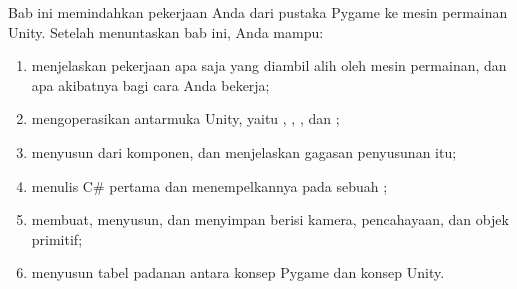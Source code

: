\begin{tujuanbox}
Bab ini memindahkan pekerjaan Anda dari pustaka Pygame ke mesin permainan
Unity. Setelah menuntaskan bab ini, Anda mampu:
\begin{enumerate}
  \item menjelaskan pekerjaan apa saja yang diambil alih oleh mesin permainan,
        dan apa akibatnya bagi cara Anda bekerja;
  \item mengoperasikan antarmuka Unity, yaitu ,
        , , dan ;
  \item menyusun  dari komponen, dan menjelaskan gagasan
        penyusunan itu;
  \item menulis  C\# pertama dan menempelkannya pada sebuah
        ;
  \item membuat, menyusun, dan menyimpan  berisi kamera,
        pencahayaan, dan objek primitif;
  \item menyusun tabel padanan antara konsep Pygame dan konsep Unity.
\end{enumerate}
\end{tujuanbox}
